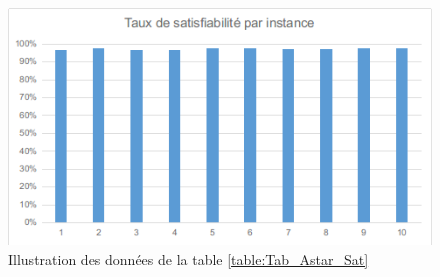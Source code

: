 \begin{figure}[H]
	\includegraphics[width=\textwidth]{images/AstarUF75Graph.png}
	\caption{Illustration des données de la table \ref{table:Tab_Astar_Sat}}
\end{figure}


